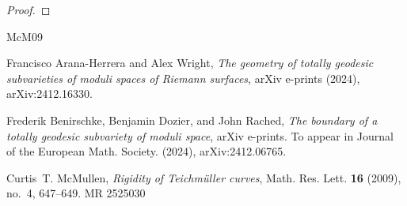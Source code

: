 \documentclass[11pt]{article}
\theoremstyle{plain}
\theoremstyle{definition}
\begin{document}
\begin{proof}
    



    
    
    

\end{proof}






{\footnotesize

\providecommand{\bysame}{\leavevmode\hbox to3em{\hrulefill}\thinspace}
\providecommand{\MR}{\relax\ifhmode\unskip\space\fi MR }
%
\providecommand{\MRhref}[2]{%
  \href{http://www.ams.org/mathscinet-getitem?mr=#1}{#2}
}
\providecommand{\href}[2]{#2}
\begin{thebibliography}{McM09}

Francisco {Arana-Herrera} and Alex {Wright}, \emph{{The geometry of totally
  geodesic subvarieties of moduli spaces of Riemann surfaces}}, arXiv e-prints
  (2024), arXiv:2412.16330.

Frederik {Benirschke}, Benjamin {Dozier}, and John {Rached}, \emph{{The
  boundary of a totally geodesic subvariety of moduli space}}, arXiv e-prints.
  To appear in Journal of the European Math. Society. (2024), arXiv:2412.06765.

Curtis~T. McMullen, \emph{Rigidity of {T}eichm\"uller curves}, Math. Res. Lett.
  \textbf{16} (2009), no.~4, 647--649. \MR{2525030}

\end{thebibliography}
%
}
\end{document}
